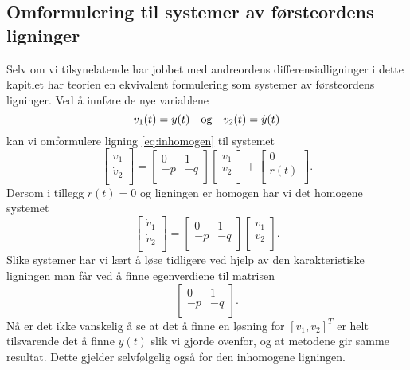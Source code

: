 \documentclass{article}
\theoremstyle{definition}
\theoremstyle{remark}
\begin{document}
\begin{multicols*}{2}
\section*{Omformulering til systemer av førsteordens ligninger}
Selv om vi tilsynelatende har jobbet med andreordens differensialligninger i dette kapitlet har teorien en ekvivalent formulering som systemer av førsteordens ligninger. Ved å innføre de nye variablene
\begin{equation*}
  v_1(t) = y(t)\ \ \textnormal{ og }\ \ v_2(t) = \dot{y}(t)
\end{equation*}
kan vi omformulere ligning \eqref{eq:inhomogen} til systemet
\begin{equation*}
  \begin{bmatrix}
    \dot{v}_1 \\
    \dot{v}_2 \\
  \end{bmatrix}
  =
  \begin{bmatrix}
    0 & 1 \\
    -p & -q \\
  \end{bmatrix}
  \begin{bmatrix}
    v_1 \\
    v_2 \\
  \end{bmatrix}
  +
  \begin{bmatrix}
    0 \\
    r(t) \\
  \end{bmatrix}.
\end{equation*}
Dersom i tillegg $r(t) = 0$ og ligningen er homogen har vi det homogene systemet
\begin{equation*}
  \begin{bmatrix}
    \dot{v}_1 \\
    \dot{v}_2 \\
  \end{bmatrix}
  =
  \begin{bmatrix}
    0 & 1 \\
    -p & -q \\
  \end{bmatrix}
  \begin{bmatrix}
    v_1 \\
    v_2 \\
  \end{bmatrix}.
\end{equation*}
Slike systemer har vi lært å løse tidligere ved hjelp av den karakteristiske ligningen man får ved å finne egenverdiene til matrisen
\begin{equation*}
  \begin{bmatrix}
    0 & 1 \\
    -p & -q \\
  \end{bmatrix}.
\end{equation*}
Nå er det ikke vanskelig å se at det å finne en løsning for $[v_1, v_2]^{T}$ er helt tilsvarende det å finne $y(t)$ slik vi gjorde ovenfor, og at metodene gir samme resultat. Dette gjelder selvfølgelig også for den inhomogene ligningen.


\end{multicols*}
\end{document}
